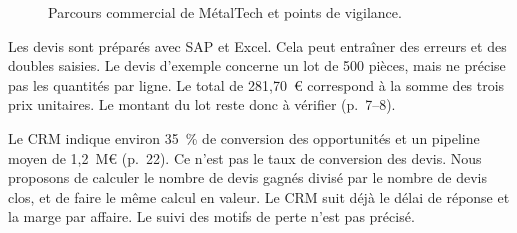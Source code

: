 \documentclass[11pt,a4paper]{article}
\newcommand{\figsource}[1]{\par\vspace{-2pt}{\RaggedRight\footnotesize\textcolor{graytext}{#1}\par}}
\begin{document}
\begin{figure}[htp]
\caption{Parcours commercial de MétalTech et points de vigilance.}
\label{fig:com}
\figsource{D'après [1], p.~7--8, 19, 22, 24. Outils : hypothèse Dynamics 365 (CRM) et SAP Business One (ERP). En rouge : constats du cas (quantités absentes, DSO) et risques à vérifier, dont la double saisie. DSO : délai moyen de paiement des clients.}
\end{figure}

Les devis sont préparés avec SAP et Excel. Cela peut entraîner des erreurs et des doubles saisies. Le devis d'exemple concerne un lot de 500 pièces, mais ne précise pas les quantités par ligne. Le total de 281,70~€ correspond à la somme des trois prix unitaires. Le montant du lot reste donc à vérifier (p.~7--8).

Le CRM indique environ 35~\% de conversion des opportunités et un pipeline moyen de 1,2~M€ (p.~22). Ce n'est pas le taux de conversion des devis. Nous proposons de calculer le nombre de devis gagnés divisé par le nombre de devis clos, et de faire le même calcul en valeur. Le CRM suit déjà le délai de réponse et la marge par affaire. Le suivi des motifs de perte n'est pas précisé.
\end{document}
